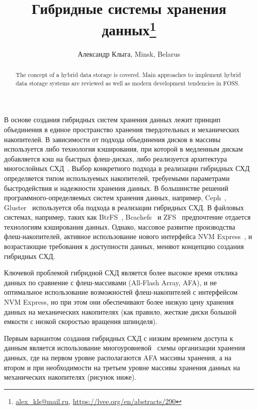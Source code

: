 \documentclass[10pt, a5paper]{article}
\begin{document}
\title{Гибридные системы хранения данных\footnote{\url{alex_kls@mail.ru}, \url{https://lvee.org/en/abstracts/290}}}
\author{Александр Клыга, Minsk, Belarus}
\maketitle
\begin{abstract}
The concept of a hybrid data storage is covered. Main approaches to implement hybrid data storage systems are reviewed as well as modern development tendencies in FOSS.
\end{abstract}
В основе создания гибридных систем хранения данных лежит принцип объединения в  единое пространство хранения твердотельных и механических накопителей. В зависимости от подхода объединения дисков в массивы используется либо технология кэширования, при которой в медленным дискам добавляется кэш на быстрых флеш-дисках, либо реализуется архитектура многослойных СХД~\cite{Klyga-1}. Выбор конкретного подхода в реализации гибридных СХД определяется типом используемых накопителей, требуемыми параметрами быстродействия и надежности хранения данных. В большинстве решений программного-определяемых систем хранения данных, например, Ceph~\cite{Klyga-6}, Gluster~\cite{Klyga-7} используется оба подхода в реализации гибридных СХД. В файловых системах, например, таких как BtrFS~\cite{Klyga-5}, Bcachefs~\cite{Klyga-3} и ZFS~\cite{Klyga-4} предпочтение отдается технологиям кэширования данных. Однако, массовое развитие производства флеш-накопителей, активное использование нового интерфейса NVM Express~\cite{Klyga-2}, и возрастающие требования к доступности данных, меняют концепцию создания гибридных СХД.

Ключевой проблемой гибридной СХД является более высокое время отклика данных по сравнение с флеш-массивами (All-Flash Array, AFA), и не оптимальное использование возможностей флеш-накопителей с интерфейсом NVM Express, но при этом они обеспечивают более низкую цену хранения данных на механических накопителях (как правило, жесткие диски большой емкости с низкой скоростью вращения шпинделя).

Первым вариантом создания гибридных СХД с низким временем доступа к данным является использование многоуровневой~\cite{Klyga-1} схемы организации хранения данных, где на первом уровне располагаются AFA массивы хранения, а на втором и при необходимости на третьем уровне массивы хранения данных на механических накопителях (рисунок ниже).
\end{document}
